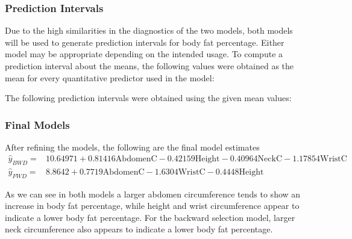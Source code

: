 \documentclass[a4paper, 11pt]{article}
\begin{document}
\subsubsection*{Prediction Intervals}
Due to the high similarities in the diagnostics of the two models, both models will be used to generate prediction intervals for body fat percentage. Either model may be appropriate depending on the intended usage. To compute a prediction interval about the means, the following values were obtained as the mean for every quantitative predictor used in the model:
	
	
The following prediction intervals were obtained using the given mean values:
	

\subsubsection*{Final Models}
After refining the models, the following are the final model estimates
\begin{align*}
	\hat{y}_{BWD} = & 10.64971 + 0.81416\text{AbdomenC} - 0.42159\text{Height} - 0.40964\text{NeckC} - 1.17854\text{WristC}\\
	\hat{y}_{FWD} = & 8.8642 + 0.7719\text{AbdomenC} - 1.6304\text{WristC} - 0.4448\text{Height}
\end{align*}

As we can see in both models a larger abdomen circumference tends to show an increase in body fat percentage, while height and wrist circumference appear to indicate a lower body fat percentage. For the backward selection model, larger neck circumference also appears to indicate a lower body fat percentage.


%
\end{document}
